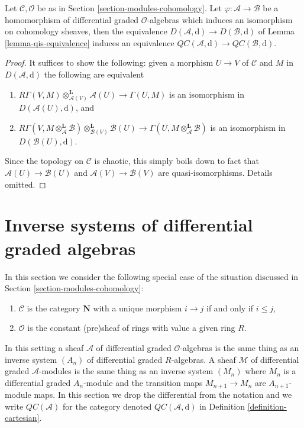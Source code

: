 \begin{lemma}
\label{lemma-cartesian-qis-equivalence}
Let $\mathcal{C}, \mathcal{O}$ be as in
Section \ref{section-modules-cohomology}. Let
$\varphi : \mathcal{A} \to \mathcal{B}$ be a homomorphism of
differential graded $\mathcal{O}$-algebras which induces an
isomorphism on cohomology sheaves, then the equivalence
$D(\mathcal{A}, \text{d}) \to D(\mathcal{B}, \text{d})$
of Lemma \ref{lemma-qis-equivalence} induces an equivalence
$\mathit{QC}(\mathcal{A}, \text{d}) \to
\mathit{QC}(\mathcal{B}, \text{d})$.
\end{lemma}

\begin{proof}
It suffices to show the following: given a morphism $U \to V$ of $\mathcal{C}$
and $M$ in $D(\mathcal{A}, \text{d})$ the following are equivalent
\begin{enumerate}
\item $R\Gamma(V, M) \otimes_{\mathcal{A}(V)}^\mathbf{L} \mathcal{A}(U)
\to \Gamma(U, M)$ is an isomorphism in $D(\mathcal{A}(U), \text{d})$, and
\item $R\Gamma(V, M \otimes_\mathcal{A}^\mathbf{L} \mathcal{B})
\otimes_{\mathcal{B}(V)}^\mathbf{L} \mathcal{B}(U)
\to \Gamma(U, M \otimes_\mathcal{A}^\mathbf{L} \mathcal{B})$
is an isomorphism in $D(\mathcal{B}(U), \text{d})$.
\end{enumerate}
Since the topology on $\mathcal{C}$ is chaotic, this simply boils down
to fact that $\mathcal{A}(U) \to \mathcal{B}(U)$ and
$\mathcal{A}(V) \to \mathcal{B}(V)$ are quasi-isomorphisms.
Details omitted.
\end{proof}






\section{Inverse systems of differential graded algebras}
\label{section-qc-inverse-system}

\noindent
In this section we consider the following special case of the situation
discussed in Section \ref{section-modules-cohomology}:
\begin{enumerate}
\item $\mathcal{C}$ is the category $\mathbf{N}$
with a unique morphism $i \to j$ if and only if $i \leq j$,
\item $\mathcal{O}$ is the constant (pre)sheaf of rings with value
a given ring $R$.
\end{enumerate}
In this setting a sheaf $\mathcal{A}$ of differential graded
$\mathcal{O}$-algebras is the same thing as an inverse system
$(A_n)$ of differential graded $R$-algebras.
A sheaf $\mathcal{M}$ of differential graded $\mathcal{A}$-modules
is the same thing as an inverse system $(M_n)$ where $M_n$ is
a differential graded $A_n$-module and the transition maps
$M_{n + 1} \to M_n$ are $A_{n + 1}$-module maps.
In this section we drop the differential from the notation
and we write $\mathit{QC}(\mathcal{A})$ for the category
denoted $\mathit{QC}(\mathcal{A}, \text{d})$ in
Definition \ref{definition-cartesian}.

